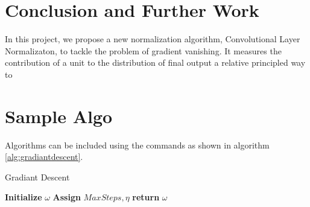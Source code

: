 \documentclass{sig-alternate}
\begin{document}
\section{Conclusion and Further Work}
    In this project, we propose a new normalization algorithm, Convolutional Layer Normalizaton, to tackle the problem of gradient vanishing. It measures the contribution of a unit to the distribution of final output a relative principled way to 

 

\section{Sample Algo}
Algorithms can be included using the commands as shown in algorithm \ref{alg:gradiantdescent}.

    \begin{algorithm}
        \caption{Gradiant Descent}\label{alg:gradiantdescent}
        \begin {algorithmic}[1]
            \STATE \textbf{Initialize} $\omega$
            \STATE \textbf{Assign} $MaxSteps, \eta$
            \ENDWHILE
            \STATE \textbf{return} $\omega$
        \end{algorithmic}
    \end{algorithm}
    
\end{document}
